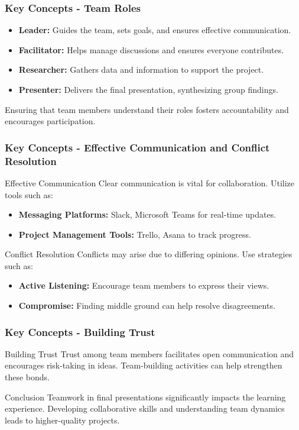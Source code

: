 \documentclass[aspectratio=169]{beamer}
\begin{document}
\begin{frame}[fragile]
    \frametitle{Key Concepts - Team Roles}
    \begin{itemize}
        \item \textbf{Leader:} Guides the team, sets goals, and ensures effective communication.
        \item \textbf{Facilitator:} Helps manage discussions and ensures everyone contributes.
        \item \textbf{Researcher:} Gathers data and information to support the project.
        \item \textbf{Presenter:} Delivers the final presentation, synthesizing group findings.
    \end{itemize}
    
    Ensuring that team members understand their roles fosters accountability and encourages participation.
\end{frame}

\begin{frame}[fragile]
    \frametitle{Key Concepts - Effective Communication and Conflict Resolution}
    \begin{block}{Effective Communication}
        Clear communication is vital for collaboration. Utilize tools such as:
        \begin{itemize}
            \item \textbf{Messaging Platforms:} Slack, Microsoft Teams for real-time updates.
            \item \textbf{Project Management Tools:} Trello, Asana to track progress.
        \end{itemize}
    \end{block}
    
    \begin{block}{Conflict Resolution}
        Conflicts may arise due to differing opinions. Use strategies such as:
        \begin{itemize}
            \item \textbf{Active Listening:} Encourage team members to express their views.
            \item \textbf{Compromise:} Finding middle ground can help resolve disagreements.
        \end{itemize}
    \end{block}
\end{frame}

\begin{frame}[fragile]
    \frametitle{Key Concepts - Building Trust}
    \begin{block}{Building Trust}
        Trust among team members facilitates open communication and encourages risk-taking in ideas.
        Team-building activities can help strengthen these bonds.
    \end{block}
    
    \begin{block}{Conclusion}
        Teamwork in final presentations significantly impacts the learning experience. 
        Developing collaborative skills and understanding team dynamics leads to higher-quality projects.
    \end{block}
\end{frame}
\end{document}
